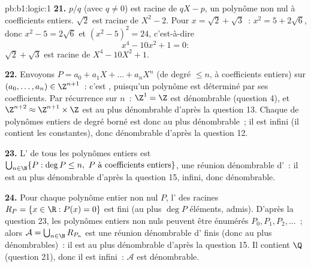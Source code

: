 \begin{solution}{pb:b1:logic:1}
\textbf{21.} $p/q$ (avec $q \neq 0$) est racine de $qX - p$, un
polynôme non nul à coefficients entiers. $\sqrt 2$ est racine de
$X^2 - 2$. Pour $x = \sqrt 2 + \sqrt 3$~: $x^2 = 5 + 2\sqrt 6$, donc
$x^2 - 5 = 2\sqrt 6$ et $(x^2 - 5)^2 = 24$, c'est-à-dire
\[
x^4 - 10x^2 + 1 = 0 :
\]
$\sqrt 2 + \sqrt 3$ est racine de $X^4 - 10X^2 + 1$.

\textbf{22.} Envoyons $P = a_0 + a_1X + \dots + a_nX^n$ (de degré
$\leq n$, à coefficients entiers) sur $(a_0, \dots, a_n) \in
\Z^{n+1}$~: c'est , puisqu'un polynôme est déterminé par ses
coefficients. Par récurrence sur $n$~: $\Z^1 = \Z$ est dénombrable
(question 4), et $\Z^{n+2} \approx \Z^{n+1} \times \Z$ est au plus
dénombrable d'après la question 13. Chaque  de polynômes
entiers de degré borné est donc au plus dénombrable~; il est infini (il
contient les constantes), donc dénombrable d'après la question 12.

\textbf{23.} L' de tous les polynômes entiers est $\bigcup_{n
\in \N} \{P : \deg P \leq n,\ P \text{ à coefficients entiers}\}$, une
réunion dénombrable d'~: il est au plus
dénombrable d'après la question 15, infini, donc dénombrable.

\textbf{24.} Pour chaque polynôme entier non nul $P$, l' des
racines $R_P = \{x \in \R : P(x) = 0\}$ est fini (au plus $\deg P$
éléments, admis). D'après la question 23, les polynômes entiers non nuls
peuvent être énumérés $P_0, P_1, P_2, \dots$~; alors $\mathcal{A} =
\bigcup_{n \in \N} R_{P_n}$ est une réunion dénombrable d'
finis (donc au plus dénombrables)~: il est au plus dénombrable d'après
la question 15. Il contient $\Q$ (question 21), donc il est infini~:
$\mathcal{A}$ est dénombrable.


\end{solution}
